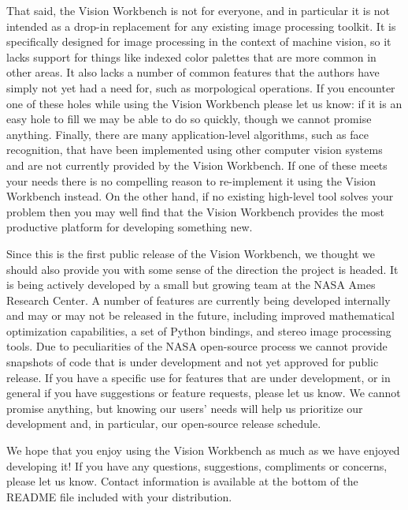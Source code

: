 That said, the Vision Workbench is not for everyone, and in particular
it is not intended as a drop-in replacement for any existing image
processing toolkit.  It is specifically designed for image processing
in the context of machine vision, so it lacks support for things like
indexed color palettes that are more common in other areas.  It also
lacks a number of common features that the authors have simply not yet
had a need for, such as morpological operations.  If you encounter one
of these holes while using the Vision Workbench please let us know: if
it is an easy hole to fill we may be able to do so quickly, though we
cannot promise anything.  Finally, there are many application-level
algorithms, such as face recognition, that have been implemented using
other computer vision systems and are not currently provided by the
Vision Workbench.  If one of these meets your needs there is no
compelling reason to re-implement it using the Vision Workbench
instead.  On the other hand, if no existing high-level tool solves
your problem then you may well find that the Vision Workbench provides
the most productive platform for developing something new.

Since this is the first public release of the Vision Workbench, we
thought we should also provide you with some sense of the direction
the project is headed.  It is being actively developed by a small but
growing team at the NASA Ames Research Center.  A number of features
are currently being developed internally and may or may not be
released in the future, including improved mathematical optimization
capabilities, a set of Python bindings, and stereo image processing
tools.  Due to peculiarities of the NASA open-source process we cannot
provide snapshots of code that is under development and not yet
approved for public release.  If you have a specific use for features
that are under development, or in general if you have suggestions or
feature requests, please let us know.  We cannot promise anything, but
knowing our users' needs will help us prioritize our development and,
in particular, our open-source release schedule.

We hope that you enjoy using the Vision Workbench as much as we have
enjoyed developing it!  If you have any questions, suggestions,
compliments or concerns, please let us know.  Contact information is
available at the bottom of the README file included with your
distribution.
